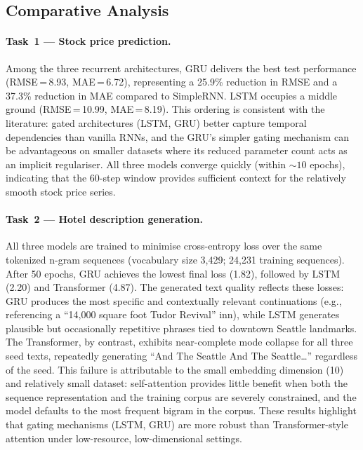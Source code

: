 \documentclass[11pt,letterpaper]{article}
\begin{document}
\subsection{Comparative Analysis}

\paragraph{Task~1 --- Stock price prediction.}
Among the three recurrent architectures, GRU delivers the best test performance
(RMSE\,=\,8.93, MAE\,=\,6.72), representing a 25.9\% reduction in RMSE and a
37.3\% reduction in MAE compared to SimpleRNN.
LSTM occupies a middle ground (RMSE\,=\,10.99, MAE\,=\,8.19).
This ordering is consistent with the literature: gated architectures (LSTM, GRU)
better capture temporal dependencies than vanilla RNNs, and the GRU's simpler
gating mechanism can be advantageous on smaller datasets where its reduced
parameter count acts as an implicit regulariser.
All three models converge quickly (within ${\sim}10$ epochs), indicating that
the 60-step window provides sufficient context for the relatively smooth stock
price series.

\paragraph{Task~2 --- Hotel description generation.}
All three models are trained to minimise cross-entropy loss over the same
tokenized n-gram sequences (vocabulary size 3{,}429; 24{,}231 training sequences).
After 50 epochs, GRU achieves the lowest final loss (1.82), followed by LSTM
(2.20) and Transformer (4.87).
The generated text quality reflects these losses: GRU produces the most specific
and contextually relevant continuations (e.g., referencing a ``14{,}000 square
foot Tudor Revival'' inn), while LSTM generates plausible but occasionally
repetitive phrases tied to downtown Seattle landmarks.
The Transformer, by contrast, exhibits near-complete mode collapse for all three
seed texts, repeatedly generating ``And The Seattle And The Seattle\ldots''
regardless of the seed.
This failure is attributable to the small embedding dimension (10) and relatively
small dataset: self-attention provides little benefit when both the sequence
representation and the training corpus are severely constrained, and the model
defaults to the most frequent bigram in the corpus.
These results highlight that gating mechanisms (LSTM, GRU) are more robust than
Transformer-style attention under low-resource, low-dimensional settings.
\end{document}
